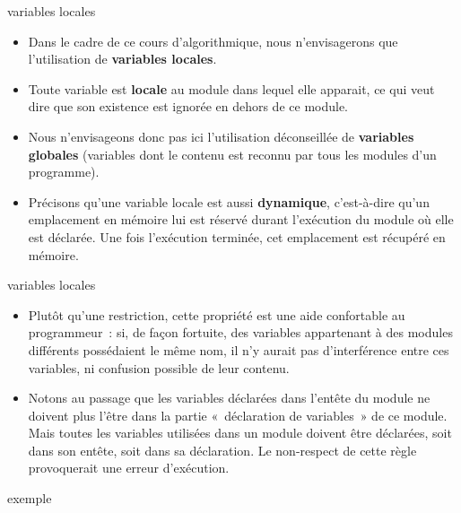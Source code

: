 \begin{frame}{variables locales}
	\begin{itemize}
	\item
	Dans le cadre de ce cours d’algorithmique,
	nous n’envisagerons que l’utilisation de 
	\textbf{variables locales}. 
	\item
	Toute variable est \textbf{locale} au module 
	dans lequel elle apparait, ce qui veut dire que son existence
	est ignorée en dehors de ce module. 
	\item
	Nous n’envisageons donc pas ici l’utilisation déconseillée de 
	\textbf{variables globales} 
	(variables dont le contenu est reconnu 
	par tous les modules d’un programme).
	\item
	Précisons qu'une variable locale est aussi
	\textbf{dynamique}, c’est-à-dire qu’un emplacement en mémoire lui est
	réservé durant l’exécution du module où elle est déclarée. Une fois
	l’exécution terminée, cet emplacement est récupéré en mémoire.
	\end{itemize}
\end{frame}

\begin{frame}{variables locales}
	\begin{itemize}
	\item
	Plutôt qu’une restriction, cette propriété est
	une aide confortable au programmeur~: si, de
	façon fortuite, des variables appartenant à des modules différents
	possédaient le même nom, il n’y aurait pas d’interférence entre ces
	variables, ni confusion possible de leur
	contenu.
	\item
	Notons au passage que les variables déclarées dans l’entête du module ne
	doivent plus l’être dans la partie «~déclaration de variables~» de ce
	module. Mais toutes les variables utilisées dans un module doivent être
	déclarées, soit dans son entête, soit dans sa déclaration. Le
	non-respect de cette règle provoquerait une erreur d’exécution.
	\end{itemize}
\end{frame}

\begin{frame}{exemple}
\end{frame}

